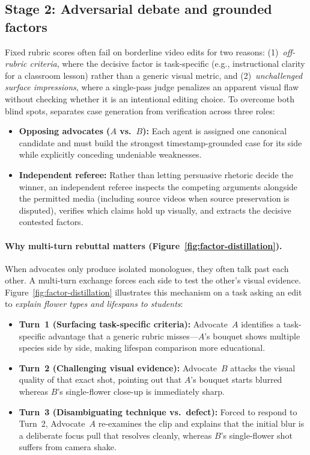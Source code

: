 \subsection{Stage 2: Adversarial debate and grounded factors}
\label{sec:debate}
Fixed rubric scores often fail on borderline video edits for two reasons: (1)~\emph{off-rubric criteria}, where the decisive factor is task-specific (e.g., instructional clarity for a classroom lesson) rather than a generic visual metric, and (2)~\emph{unchallenged surface impressions}, where a single-pass judge penalizes an apparent visual flaw without checking whether it is an intentional editing choice. To overcome both blind spots, \critical separates case generation from verification across three roles:
\begin{itemize}[leftmargin=*, topsep=2pt, itemsep=2pt]
  \item \textbf{Opposing advocates ($A$ vs.\ $B$):} Each agent is assigned one canonical candidate and must build the strongest timestamp-grounded case for its side while explicitly conceding undeniable weaknesses.
  \item \textbf{Independent referee:} Rather than letting persuasive rhetoric decide the winner, an independent referee inspects the competing arguments alongside the permitted media (including source videos when source preservation is disputed), verifies which claims hold up visually, and extracts the decisive contested factors.
\end{itemize}

\paragraph{Why multi-turn rebuttal matters (Figure~\ref{fig:factor-distillation}).}
When advocates only produce isolated monologues, they often talk past each other. A multi-turn exchange forces each side to test the other's visual evidence. Figure~\ref{fig:factor-distillation} illustrates this mechanism on a task asking an edit to \emph{explain flower types and lifespans to students}:
\begin{itemize}[leftmargin=*, topsep=2pt, itemsep=1pt]
  \item \textbf{Turn~1 (Surfacing task-specific criteria):} Advocate~$A$ identifies a task-specific advantage that a generic rubric misses---$A$'s bouquet shows multiple species side by side, making lifespan comparison more educational.
  \item \textbf{Turn~2 (Challenging visual evidence):} Advocate~$B$ attacks the visual quality of that exact shot, pointing out that $A$'s bouquet starts blurred whereas $B$'s single-flower close-up is immediately sharp.
  \item \textbf{Turn~3 (Disambiguating technique vs.\ defect):} Forced to respond to Turn~2, Advocate~$A$ re-examines the clip and explains that the initial blur is a deliberate focus pull that resolves cleanly, whereas $B$'s single-flower shot suffers from camera shake.
\end{itemize}

